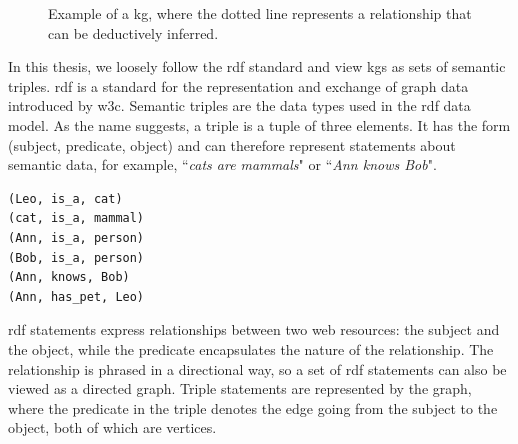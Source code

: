 \begin{figure}[htbp]
\centering
{}

\caption[Simple visual example of a KG.]{Example of a \gls{kg}, where the dotted line represents a relationship that can be deductively inferred.} \label{fig:KGexample}
\end{figure}

In this thesis, we loosely follow the \gls{rdf} standard and view \glspl{kg} as sets of semantic triples. \gls{rdf} is a standard for the representation and exchange of graph data introduced by \gls{w3c}. Semantic triples are the data types used in the \gls{rdf} data model. As the name suggests, a triple is a tuple of three elements. It has the form (subject, predicate, object) and can therefore represent statements about semantic data, for example, ``\textit{cats are mammals}" or ``\textit{Ann knows Bob}". 
\begin{lstlisting}[caption={Example of RDF triple set written in informal pseudocode.}, label={RDF_triples_example}]
(Leo, is_a, cat)
(cat, is_a, mammal)
(Ann, is_a, person)
(Bob, is_a, person)
(Ann, knows, Bob)
(Ann, has_pet, Leo)
\end{lstlisting}
\gls{rdf} statements express relationships between two web resources: the subject and the object, while the predicate encapsulates the nature of the relationship. The relationship is phrased in a directional way, so a set of \gls{rdf} statements can also be viewed as a directed graph. Triple statements are represented by the graph, where the predicate in the triple denotes the edge going from the subject to the object, both of which are vertices.


